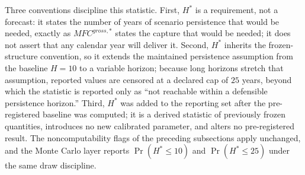 \documentclass[11pt,a4paper]{article}
\begin{document}
Three conventions discipline this statistic. First, $H^{*}$ is a requirement, not a
forecast: it states the number of years of scenario persistence that would be needed,
exactly as $MFC^{gross,*}$ states the capture that would be needed; it does not assert that
any calendar year will deliver it. Second, $H^{*}$ inherits the frozen-structure convention,
so it extends the maintained persistence assumption from the baseline $H=10$ to a variable
horizon; because long horizons stretch that assumption, reported values are censored at a
declared cap of $25$ years, beyond which the statistic is reported only as ``not reachable
within a defensible persistence horizon.'' Third, $H^{*}$ was added to the reporting set
after the pre-registered baseline was computed; it is a derived statistic of previously
frozen quantities, introduces no new calibrated parameter, and alters no pre-registered
result. The noncomputability flags of the preceding subsections apply unchanged, and the
Monte Carlo layer reports $\Pr(H^{*}\leq 10)$ and $\Pr(H^{*}\leq 25)$ under the same draw
discipline.
\end{document}
